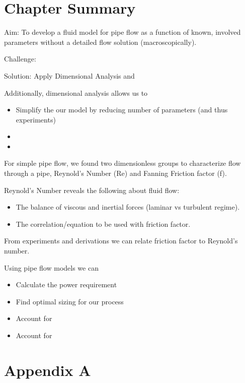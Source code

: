 \documentclass[paper=a4, fontsize=12pt]{scrartcl} %
\numberwithin{equation}{section} %
\numberwithin{figure}{section} %
\numberwithin{table}{section} %
\begin{document}
\newpage
\section*{Chapter Summary}
Aim: To develop a fluid model for pipe flow as a function of known, involved parameters without a detailed flow solution (macroscopically).

\vspace{1cm}  Challenge:

\vspace{1cm}  Solution: Apply Dimensional Analysis and

\vspace{1cm}  Additionally, dimensional analysis allows us to 
\begin{itemize}
  \item Simplify the our model by reducing number of parameters (and thus experiments)
  \item 
  \item
\end{itemize}

For simple pipe flow, we found two dimensionless groups to characterize flow through a pipe, Reynold's Number (Re) and Fanning Friction factor (f).

\vspace{1cm}  Reynold's Number reveals the following about fluid flow:
\begin{itemize}
  \item The balance of viscous and inertial forces (laminar vs turbulent regime).
  \item The correlation/equation to be used with friction factor. 
\end{itemize}

From experiments and derivations we can relate friction factor to Reynold's number. 

Using pipe flow models we can

\begin{itemize}
  \item Calculate the power requirement
  \item Find optimal sizing for our process
  \item Account for 
  \item Account for 
\end{itemize}

\newpage

\section*{Appendix A}
\end{document}
